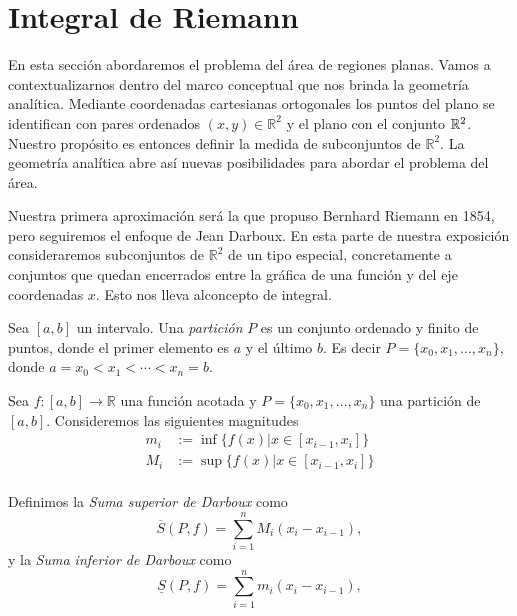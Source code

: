 \section{Integral de Riemann}

En esta sección abordaremos el problema del área de regiones planas. Vamos a contextualizarnos dentro del marco conceptual que nos brinda la geometría analítica. Mediante coordenadas cartesianas ortogonales los puntos del plano se identifican con pares ordenados $(x,y)\in\mathbb{R}^2$ y el plano con el conjunto $\mathbb{R}^2$.  Nuestro propósito es entonces definir la medida de subconjuntos de $\mathbb{R}^2$. La geometría analítica abre así nuevas posibilidades para abordar el problema del área. 

Nuestra primera aproximación será la que propuso Bernhard Riemann en 1854, pero seguiremos  el enfoque de Jean Darboux. En esta parte de nuestra exposición consideraremos subconjuntos de $\mathbb{R}^2$ de un tipo especial, concretamente a conjuntos que quedan encerrados entre la gráfica de una función y del eje coordenadas $x$. Esto nos lleva alconcepto de integral. 


\begin{definicion}[Partición] Sea $[a,b]$ un intervalo. Una {\em partición} $P$ es un conjunto ordenado y finito de puntos, donde el primer elemento es $a$ y el último $b$. Es decir $P=\{x_0,x_1,\ldots,x_n\}$, donde $a=x_0<x_1<\cdots<x_n=b$. 
 
\end{definicion}




\begin{definicion} Sea $f:[a,b]\to\mathbb{R}$ una función acotada y $P=\{x_0,x_1,\ldots,x_n\}$ una partición de $[a,b]$. Consideremos las siguientes magnitudes
\[
 \begin{split}
    m_i&:=\inf\{f(x)| x\in [x_{i-1},x_i]\}\\
    M_i&:=\sup\{f(x)| x\in [x_{i-1},x_i]\}\\
 \end{split}
\]

Definimos la \emph{Suma superior de Darboux} como
\[
 \overline{S}(P,f)=\sum_{i=1}^nM_i(x_i-x_{i-1}),
\]
y la \emph{Suma inferior de Darboux} como
\[
 \underline{S}(P,f)=\sum_{i=1}^nm_i(x_i-x_{i-1}),
\] 
\end{definicion}

